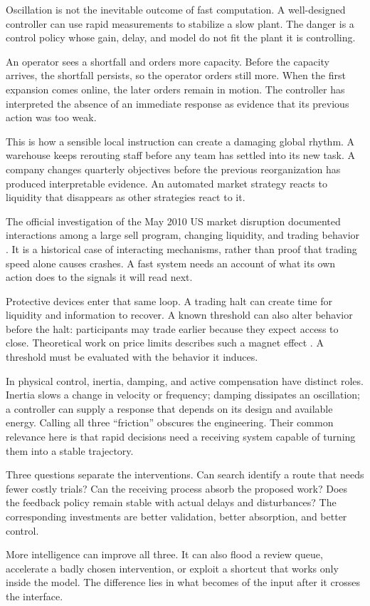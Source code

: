 Oscillation is not the inevitable outcome of fast computation. A well-designed controller can use rapid measurements to stabilize a slow plant. The danger is a control policy whose gain, delay, and model do not fit the plant it is controlling.

An operator sees a shortfall and orders more capacity. Before the capacity arrives, the shortfall persists, so the operator orders still more. When the first expansion comes online, the later orders remain in motion. The controller has interpreted the absence of an immediate response as evidence that its previous action was too weak.

This is how a sensible local instruction can create a damaging global rhythm. A warehouse keeps rerouting staff before any team has settled into its new task. A company changes quarterly objectives before the previous reorganization has produced interpretable evidence. An automated market strategy reacts to liquidity that disappears as other strategies react to it.

The official investigation of the May 2010 US market disruption documented interactions among a large sell program, changing liquidity, and trading behavior \cite{sec2010findings}. It is a historical case of interacting mechanisms, rather than proof that trading speed alone causes crashes. A fast system needs an account of what its own action does to the signals it will read next.

Protective devices enter that same loop. A trading halt can create time for liquidity and information to recover. A known threshold can also alter behavior before the halt: participants may trade earlier because they expect access to close. Theoretical work on price limits describes such a magnet effect \cite{subrahmanyam1994}. A threshold must be evaluated with the behavior it induces.

In physical control, inertia, damping, and active compensation have distinct roles. Inertia slows a change in velocity or frequency; damping dissipates an oscillation; a controller can supply a response that depends on its design and available energy. Calling all three “friction” obscures the engineering. Their common relevance here is that rapid decisions need a receiving system capable of turning them into a stable trajectory.

Three questions separate the interventions. Can search identify a route that needs fewer costly trials? Can the receiving process absorb the proposed work? Does the feedback policy remain stable with actual delays and disturbances? The corresponding investments are better validation, better absorption, and better control.

More intelligence can improve all three. It can also flood a review queue, accelerate a badly chosen intervention, or exploit a shortcut that works only inside the model. The difference lies in what becomes of the input after it crosses the interface.
